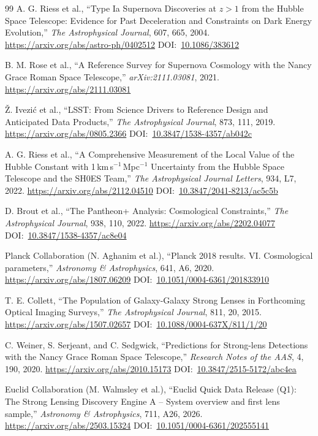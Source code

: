 \documentclass[10pt,onecolumn]{article}
\newcommand{\doi}[1]{DOI:~\href{https://doi.org/#1}{#1}}
\begin{document}
\begin{thebibliography}{99}
A. G. Riess et al.,
``Type Ia Supernova Discoveries at $z>1$ from the Hubble Space Telescope: Evidence for Past Deceleration and Constraints on Dark Energy Evolution,''
\emph{The Astrophysical Journal}, 607, 665, 2004.
\url{https://arxiv.org/abs/astro-ph/0402512}
\doi{10.1086/383612}

B. M. Rose et al.,
``A Reference Survey for Supernova Cosmology with the Nancy Grace Roman Space Telescope,''
\emph{arXiv:2111.03081}, 2021.
\url{https://arxiv.org/abs/2111.03081}

{\v Z}. Ivezi{\'c} et al.,
``LSST: From Science Drivers to Reference Design and Anticipated Data Products,''
\emph{The Astrophysical Journal}, 873, 111, 2019.
\url{https://arxiv.org/abs/0805.2366}
\doi{10.3847/1538-4357/ab042c}

A. G. Riess et al.,
``A Comprehensive Measurement of the Local Value of the Hubble Constant with 1\,km\,s$^{-1}$\,Mpc$^{-1}$ Uncertainty from the Hubble Space Telescope and the SH0ES Team,''
\emph{The Astrophysical Journal Letters}, 934, L7, 2022.
\url{https://arxiv.org/abs/2112.04510}
\doi{10.3847/2041-8213/ac5c5b}

D. Brout et al.,
``The Pantheon+ Analysis: Cosmological Constraints,''
\emph{The Astrophysical Journal}, 938, 110, 2022.
\url{https://arxiv.org/abs/2202.04077}
\doi{10.3847/1538-4357/ac8e04}

Planck Collaboration (N. Aghanim et al.),
``Planck 2018 results. VI. Cosmological parameters,''
\emph{Astronomy \& Astrophysics}, 641, A6, 2020.
\url{https://arxiv.org/abs/1807.06209}
\doi{10.1051/0004-6361/201833910}

T. E. Collett,
``The Population of Galaxy-Galaxy Strong Lenses in Forthcoming Optical Imaging Surveys,''
\emph{The Astrophysical Journal}, 811, 20, 2015.
\url{https://arxiv.org/abs/1507.02657}
\doi{10.1088/0004-637X/811/1/20}

C. Weiner, S. Serjeant, and C. Sedgwick,
``Predictions for Strong-lens Detections with the Nancy Grace Roman Space Telescope,''
\emph{Research Notes of the AAS}, 4, 190, 2020.
\url{https://arxiv.org/abs/2010.15173}
\doi{10.3847/2515-5172/abc4ea}

Euclid Collaboration (M. Walmsley et al.),
``Euclid Quick Data Release (Q1): The Strong Lensing Discovery Engine A -- System overview and first lens sample,''
\emph{Astronomy \& Astrophysics}, 711, A26, 2026.
\url{https://arxiv.org/abs/2503.15324}
\doi{10.1051/0004-6361/202555141}


\end{thebibliography}
\end{document}
